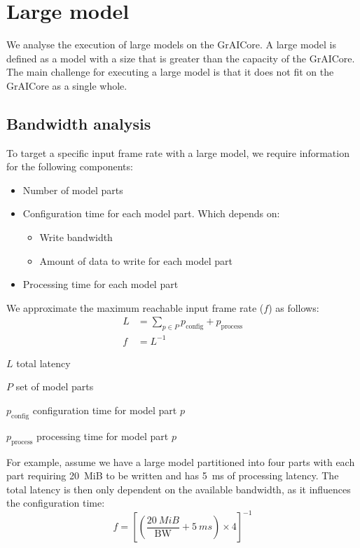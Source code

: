 \section{Large model}

We analyse the execution of large models on the GrAICore.
A large model is defined as a model with a size that is greater than the capacity of the GrAICore.
The main challenge for executing a large model is that it does not fit on the GrAICore as a single whole.

\subsection{Bandwidth analysis}
To target a specific input frame rate with a large model, we require information for the following components:
\begin{itemize}
    \item Number of model parts
    \item Configuration time for each model part. Which depends on:
    \begin{itemize}
        \item Write bandwidth
        \item Amount of data to write for each model part
    \end{itemize}
    \item Processing time for each model part
\end{itemize}

We approximate the maximum reachable input frame rate ($f$) as follows:
\begin{align*} 
    L &= \sum_{p \in P}^{}{p_{\textrm{config}} + p_{\textrm{process}}} \\
    f &= L^{-1}
\end{align*}

\begin{eqexpl}[15mm]
    \item{$L$} total latency
    \item{$P$} set of model parts
    \item{$p_{\textrm{config}}$} configuration time for model part $p$
    \item{$p_{\textrm{process}}$} processing time for model part $p$
\end{eqexpl}

For example, assume we have a large model partitioned into four parts with each part requiring \SI{20}{MiB} to be written and has \SI{5}{ms} of processing latency.
The total latency is then only dependent on the available bandwidth, as it influences the configuration time:
\begin{equation*}
    f = \left[ \left( \frac{\SI{20}{MiB}}{\textrm{BW}} + \SI{5}{ms} \right) \times 4 \right]^{-1}
\end{equation*}

